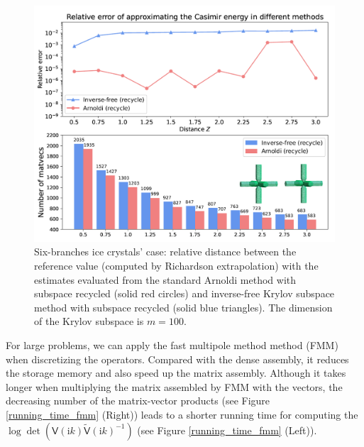         \begin{figure}[H]
                \centering
                \includegraphics[scale = 1]{figures/6branches_rel_err.png}
                \caption{Six-branches ice crystals' case: relative distance between the reference value (computed by Richardson extrapolation) with the estimates evaluated from the standard Arnoldi 
                method with subspace recycled (solid red circles) and inverse-free Krylov subspace method with subspace recycled (solid blue triangles). The dimension of the Krylov subspace is $m = 100$.}       
             \end{figure}
For large problems, we can apply the fast multipole method method (FMM)\cite{ying2004kernel} when discretizing the operators. Compared with the dense assembly, it reduces 
the storage memory and also speed up the matrix assembly. Although it takes longer when multiplying the matrix assembled by FMM with the vectors, 
the decreasing number of the matrix-vector products (see Figure \ref{running_time_fmm} (Right)) leads to a shorter running time for computing the $\log\det(\mathsf{V}(\mathrm{i}k)\tilde{\mathsf{V}}(\mathrm{i}k)^{-1})$
(see Figure \ref{running_time_fmm} (Left)). 
